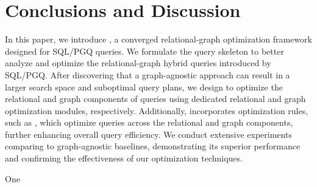 
\section{Conclusions and Discussion}
\label{sec:conclusions}

In this paper, we introduce \name, a converged relational-graph optimization framework designed for SQL/PGQ queries. We formulate the \spjm query skeleton to better analyze and optimize the relational-graph hybrid queries introduced by SQL/PGQ. After discovering that a graph-agnostic approach can result in a larger search space and suboptimal query plans, we design \name to optimize the relational and graph components of \spjm queries using dedicated relational and graph optimization modules, respectively. Additionally, \name incorporates optimization rules, such as \filterrule, which optimize queries across the relational and graph components, further enhancing overall query efficiency.
We conduct extensive experiments comparing \name to graph-agnostic baselines, demonstrating its superior performance and confirming the effectiveness of our optimization techniques.



One 





\balance
